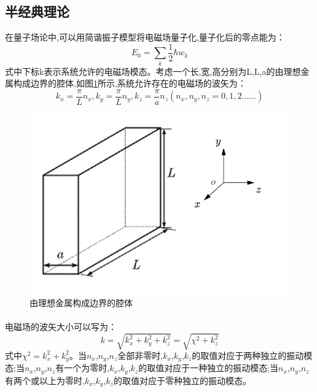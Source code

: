 \subsection{半经典理论}
在量子场论中,可以用简谐振子模型将电磁场量子化,量子化后的零点能为：
$$
E_0=\sum_k{\frac{1}{2} \hbar w_k}
$$
式中下标k表示系统允许的电磁场模态。考虑一个长,宽,高分别为L,L,a的由理想金属构成边界的腔体,如图\ref{fig:1}所示,系统允许存在的电磁场的波矢为：
$$
k_x=\frac{\pi}{L}n_x,k_y=\frac{\pi}{L}n_y,k_z=\frac{\pi}{a}n_z\left( n_x,n_y,n_z=0,1,2...... \right) 
$$
\begin{figure}[htb]
	\centering
	\includegraphics[width=0.7\linewidth]{figures/金属边界腔体}
	\caption{由理想金属构成边界的腔体}
	\label{fig:1}
\end{figure}
\paragraph*{}
电磁场的波矢大小可以写为：
$$
k=\sqrt{k_{x}^{2}+k_{y}^{2}+k_{z}^{2}}=\sqrt{\chi ^2+k_{z}^{2}}
$$
式中$\chi ^2=k_{x}^{2}+k_{y}^{2}$。当$n_x$,$n_y$,$n_z$全部非零时,$k_x$,$k_y$,$k_z$的取值对应于两种独立的振动模态;当$n_x$,$n_y$,$n_z$有一个为零时,$k_x$,$k_y$,$k_z$的取值对应于一种独立的振动模态;当$n_x$,$n_y$,$n_z$有两个或以上为零时,$k_x$,$k_y$,$k_z$的取值对应于零种独立的振动模态\cite{GuoShuohong_2008}。
